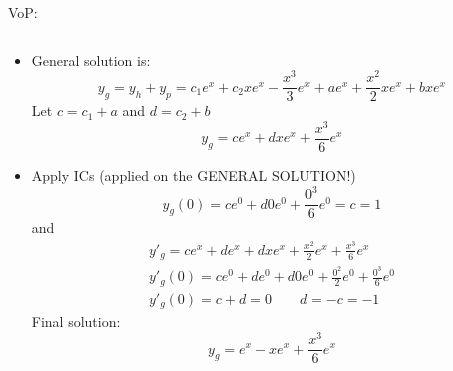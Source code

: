 \begin{exmp}{VoP:}
\begin{itemize}
\begin {equation*}
\end {equation*}
\item General solution is:
\begin {equation*}
y_g=y_h+y_p=c_1e^x +c_2 xe^x-\frac{x^3}{3}e^x +ae^x +\frac{x^2}{2}xe^x+bxe^x
\end {equation*}
Let $c=c_1+a$ and $d=c_2+b$
\begin {equation*}
\boxed{y_g=ce^x +d xe^x+\frac{x^3}{6}e^x}
\end {equation*}
\item Apply ICs (applied on the GENERAL SOLUTION!)
\begin {equation*}
y_g(0)= ce^0 +d 0e^0+\frac{0^3}{6}e^0=c=1
\end {equation*}
and 
\begin {align*}
y'_g= ce^x  +d e^x+d xe^x+\frac{x^2}{2}e^x+\frac{x^3}{6}e^x\\
y'_g(0)= ce^0  +d e^0+d 0e^0+\frac{0^2}{2}e^0+\frac{0^3}{6}e^0\\
y'_g(0)= c  +d=0 \qquad d=-c=-1
\end {align*}
Final solution:
\begin {equation*}
\boxed{y_g=e^x - xe^x+\frac{x^3}{6}e^x}
\end {equation*}


\end{itemize}


\end{exmp}

\updateinfo[October 30, 2018]

